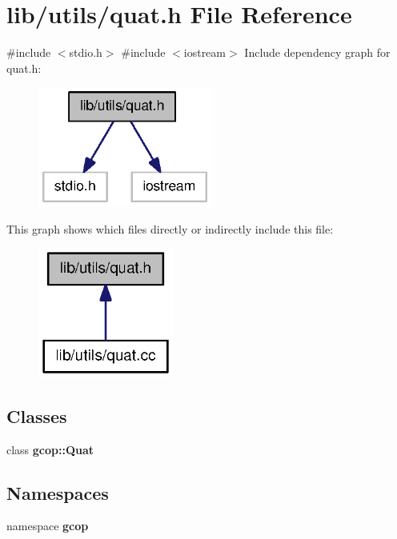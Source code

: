 \section{lib/utils/quat.h \-File \-Reference}
\label{quat_8h}
{\ttfamily \#include $<$stdio.\-h$>$}\*
{\ttfamily \#include $<$iostream$>$}\*
\-Include dependency graph for quat.\-h\-:\nopagebreak
\begin{figure}[H]
\begin{center}
\leavevmode
\includegraphics[width=162pt]{quat_8h__incl}
\end{center}
\end{figure}
\-This graph shows which files directly or indirectly include this file\-:\nopagebreak
\begin{figure}[H]
\begin{center}
\leavevmode
\includegraphics[width=126pt]{quat_8h__dep__incl}
\end{center}
\end{figure}
\subsection*{\-Classes}
\begin{DoxyCompactItemize}
\item 
class {\bf gcop\-::\-Quat}
\end{DoxyCompactItemize}
\subsection*{\-Namespaces}
\begin{DoxyCompactItemize}
\item 
namespace {\bf gcop}
\end{DoxyCompactItemize}
